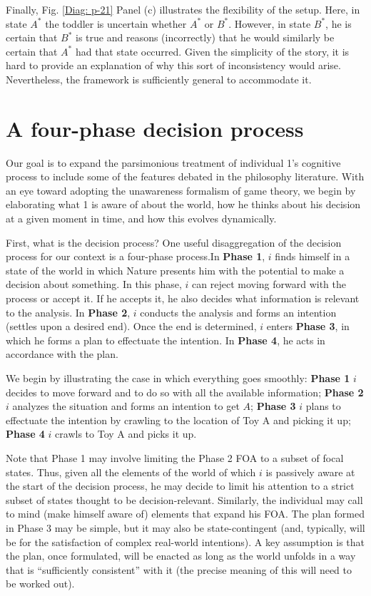 \documentclass[
11pt,
titlepage,
reqno,
]{article}%
\theoremstyle{definition}
\begin{document}
Finally, Fig. \ref{Diag: p-21} Panel (c) illustrates the flexibility of the setup. Here, in state $A^\ast$ the toddler is uncertain whether $A^\ast$ or $B^\ast$. However, in state $B^\ast$, he is certain that $B^\ast$ is true and reasons (incorrectly) that he would similarly be certain that $A^\ast$ had that state occurred. Given the simplicity of the story, it is hard to provide an explanation of why this sort of inconsistency would arise. Nevertheless, the framework is sufficiently general to accommodate it.



\section*{A four-phase decision process}
Our goal is to expand the parsimonious treatment of individual 1's cognitive process to include some of the features debated in the philosophy literature. With an eye toward adopting the unawareness formalism of game theory, we begin by elaborating what 1 is aware of about the world, how he thinks about his decision at a given moment in time, and how this evolves dynamically. 

First, what is the decision process? One useful disaggregation of the decision process for our context is a four-phase process.In \textbf{Phase 1}, $i$ finds himself in a state of the world in which Nature presents him with the potential to make a decision about something. In this phase, $i$ can reject moving forward with the process or accept it. If he accepts it, he also decides what information is relevant to the analysis. In \textbf{Phase 2}, $i$ conducts the analysis and forms an intention (settles upon a desired end). Once the end is determined, $i$ enters \textbf{Phase 3}, in which he forms a plan to effectuate the intention.  In \textbf{Phase 4}, he acts in accordance with the plan.

We  begin by illustrating the case in which everything goes smoothly: \textbf{Phase 1} $i$ decides to move forward and to do so with all the available information; \textbf{Phase 2} $i$ analyzes the situation and forms an intention to get $A$; \textbf{Phase 3} $i$  plans to effectuate the intention by crawling to the location of Toy A and picking it up; \textbf{Phase 4} $i$ crawls to Toy A and picks it up. 

Note that Phase 1 may involve limiting the Phase 2 FOA to a subset of focal states. Thus, given all the elements of the world of which $i$ is passively aware at the start of the decision process, he may decide to limit his attention to a strict subset of states thought to be  decision-relevant. Similarly, the individual may call to mind (make himself aware of) elements that expand his FOA. The plan formed in Phase 3 may be simple, but it may also be state-contingent (and, typically, will be for the satisfaction of complex real-world intentions). A key assumption is that the plan, once formulated, will be enacted as long as the world unfolds in a way that is ``sufficiently consistent'' with it (the precise meaning of this will need to be worked out). 
\end{document}
